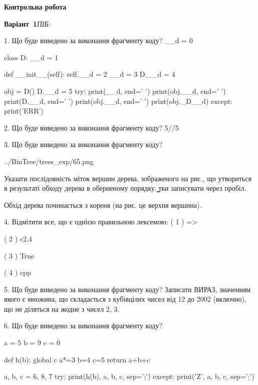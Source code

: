 \documentclass[11pt]{article}
\begin{document}
{\large\textbf{Контрольна робота}}

\textbf{Варіант \No\,1}\hfill \textit{ПІБ:}\,\underline{\hspace{60mm}}
\vspace{4mm}

1. Що буде виведено за виконання фрагменту коду?
__d = 0

class D:
    __d = 1
    
    def __init__(self):
        self.__d = 2
        __d = 3
        D.__d = 4

obj = D()
D.__d = 5
try:
    print(__d, end=' ')
    print(obj.__d, end=' ')
    print(D.__d, end=' ')
    print(obj.__d, end=' ')
    print(obj._D__d)
except:
    print('ERR')


2. Що буде виведено за виконання фрагменту коду?
5//5%

3. Що буде виведено за виконання фрагменту коду?

\begin{center}
	{../BinTree/trees_exp/65.png}
\end{center}
Указати послідовність міток вершин дерева, зображеного на рис., що утвориться в результаті обходу дерева в оберненому порядку. ̳тки записувати через пробіл.\par Обхід дерева починається з кореня (на рис. це верхня вершина).

4. %
Відмітити все, що є однією правильною лексемою:
( 1 ) =>

( 2 ) c2,4

( 3 ) True

( 4 ) cpp


5. Що буде виведено за виконання фрагменту коду?
Записати ВИРАЗ, значенням якого є множина, що складається з кубівцілих чисел від 12 до 2002 (включно), що не діляться на жодне з чисел 2, 3.


6. Що буде виведено за виконання фрагменту коду?

a = 5
b = 9
c = 0

def h(b):
global c    a*=3
    b=4
    c=5
    return a+b+c

a, b, c = 6, 8, 7
try:
    print(h(b), a, b, c, sep=';')
except:
    print('Z', a, b, c, sep=';')
\end{document}
